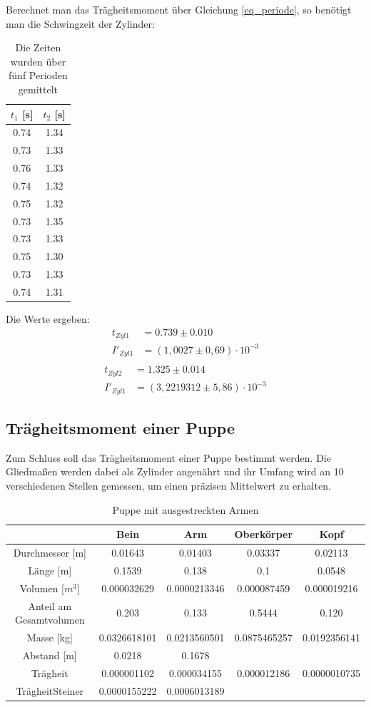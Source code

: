 Berechnet man das Trägheitsmoment über Gleichung \eqref{eq_periode}, so benötigt man die Schwingzeit der Zylinder:
\begin{table}[htbp]
\begin{tabular}{|c|c|}
\hline 
$t_1$ [s] & $t_2$ [s]\\ \hline
0.74&	1.34\\ \hline
0.73&	1.33\\ \hline
0.76&	1.33\\ \hline
0.74&	1.32\\ \hline
0.75&	1.32\\ \hline
0.73&	1.35\\ \hline
0.73&	1.33\\ \hline
0.75&	1.30\\ \hline
0.73&	1.33\\ \hline
0.74&	1.31\\ \hline
\end{tabular} 
\caption{Die Zeiten wurden über fünf Perioden gemittelt}
\end{table}
\newpage
Die Werte ergeben:
\begin{align*}
t_{Zyl 1}&=0.739 \pm 0.010\\
I'_{Zyl 1}&=(1,0027\pm0,69)\cdot10^{-3}\\
\end{align*}
\begin{align*}
t_{Zyl 2}&=1.325 \pm  0.014\\
I'_{Zyl 1}&=(3,2219312\pm5,86)\cdot10^{-3}
\end{align*}

\subsection{Trägheitsmoment einer Puppe}
Zum Schluss soll das Trägheitsmoment einer Puppe bestimmt werden. Die Gliedmaßen werden dabei als Zylinder angenährt und ihr Umfang wird an 10 verschiedenen Stellen gemessen, um einen präzisen Mittelwert zu erhalten.
\begin{table}[htbp]
\begin{tabular}{|c|c|c|c|c|}
\hline 		
&	Bein&	Arm	&Oberkörper	&Kopf	\\ \hline	
Durchmesser [m]&	0.01643&	0.01403&	0.03337&	0.02113\\ \hline				
Länge [m] &	0.1539	&0.138	&0.1	&0.0548\\ \hline	
					
Volumen [$m^3$]	&0.000032629	&0.0000213346	&0.000087459	&0.000019216	\\ \hline	
Anteil am Gesamtvolumen	&0.203	&0.133	&0.5444	&0.120	\\ \hline		
Masse [kg]	&0.0326618101	&0.0213560501	&0.0875465257	&0.0192356141\\ \hline
Abstand [m]	&0.0218	&0.1678	&&\\ \hline	
					
Trägheit&	0.000001102	&0.000034155&	0.000012186	&0.0000010735\\ \hline	
TrägheitSteiner	&0.0000155222	&0.0006013189	&&	\\ \hline	
\end{tabular} 
\caption{Puppe mit ausgestreckten Armen}
\end{table}

